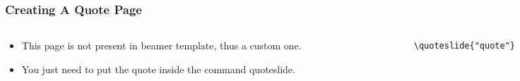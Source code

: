\begin{slide}
  \frametitle{Creating A Quote Page}
  \begin{columns}
    \begin{column}{.4\textwidth}
      \begin{itemize}
        \item This page is not present in beamer template, thus a custom one.
        \item You just need to put the quote inside the command quoteslide.
      \end{itemize}
    \end{column}
    \begin{column}{.6\textwidth}
      \small
      \begin{verbatim}
\quoteslide{"quote"}
      \end{verbatim}
    \end{column}
  \end{columns}
\end{slide}





